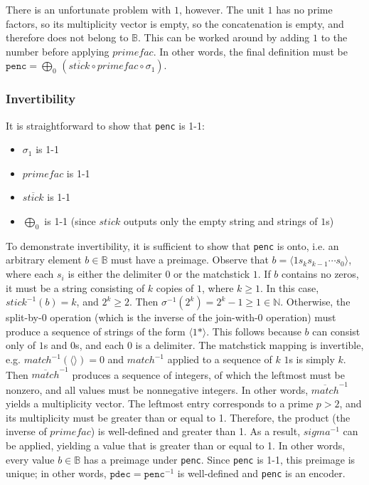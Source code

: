 \documentclass[12pt,reqno]{article}
\begin{document}
There is an unfortunate problem with $1$, however. The unit $1$ has no prime factors, so its multiplicity vector is empty, so the concatenation is empty, and therefore does not belong to $\mathbb{B}$. This can be worked around by adding $1$ to the number before applying $primefac$. In other words, the final definition must be $\texttt{penc} = \bigoplus_0 \, (\overline{stick} \circ primefac \circ \sigma_1)$.

\subsubsection{Invertibility}

It is straightforward to show that \texttt{penc} is 1-1: \begin{itemize}
  \item $\sigma_1$ is 1-1
  \item $primefac$ is 1-1
  \item $\overline{stick}$ is 1-1
  \item $\bigoplus_0$ is 1-1 (since $stick$ outputs only the empty string and strings of $1$s)
\end{itemize}


To demonstrate invertibility, it is sufficient to show that \texttt{penc} is onto, i.e. an arbitrary element $b \in \mathbb{B}$ must have a preimage. Observe that $b = \langle 1 s_{k} s_{k-1} \cdots s_0 \rangle$, where each $s_i$ is either the delimiter $0$ or the matchstick $1$. If $b$ contains no zeros, it must be a string consisting of $k$ copies of $1$, where $k \geq 1$. In this case, $stick^{-1}(b) = k$, and $2^k \geq 2$. Then $\sigma^{-1}(2^k) = 2^k - 1 \geq 1\in \mathbb{N}$. Otherwise, the split-by-$0$ operation (which is the inverse of the join-with-$0$ operation) must produce a sequence of strings of the form $\langle 1* \rangle$. This follows because $b$ can consist only of $1$s and $0$s, and each $0$ is a delimiter. The matchstick mapping is invertible, e.g. $match^{-1}(\langle \rangle) = 0$ and $match^{-1}$ applied to a sequence of $k$ $1$s is simply $k$. Then $\overline{match}^{-1}$ produces a sequence of integers, of which the leftmost must be nonzero, and all values must be nonnegative integers. In other words, $\overline{match}^{-1}$ yields a multiplicity vector. The leftmost entry corresponds to a prime $p > 2$, and its multiplicity must be greater than or equal to 1. Therefore, the product (the inverse of $primefac$) is well-defined and greater than 1. As a result, $sigma^{-1}$ can be applied, yielding a value that is greater than or equal to 1. In other words, every value $b \in \mathbb{B}$ has a preimage under \texttt{penc}. Since \texttt{penc} is 1-1, this preimage is unique; in other words, $\texttt{pdec} = \texttt{penc}^{-1}$ is well-defined and \texttt{penc} is an encoder.
\end{document}
